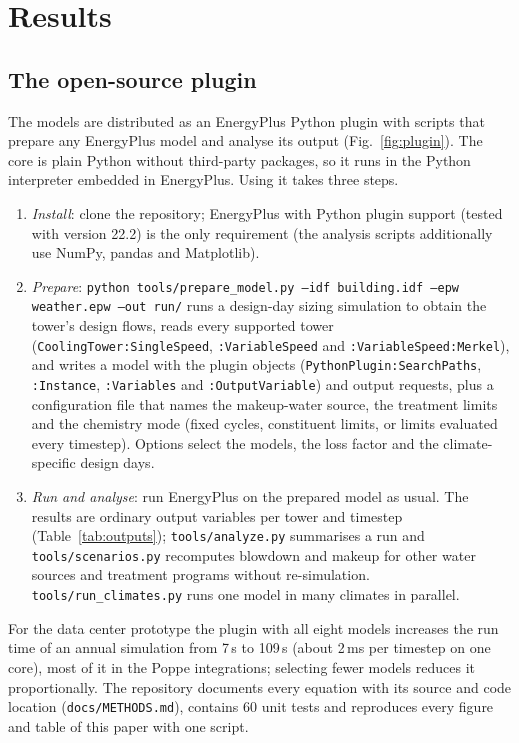 \documentclass[preprint,12pt]{elsarticle}
\begin{document}
\section{Results}\label{sec:results}
\subsection{The open-source plugin}\label{sec:tool}
The models are distributed as an EnergyPlus Python plugin with scripts that prepare any EnergyPlus model and analyse
its output (Fig.~\ref{fig:plugin}). The core is plain Python without third-party packages, so it runs in the Python
interpreter embedded in EnergyPlus. Using it takes three steps.
\begin{enumerate}
\item \emph{Install}: clone the repository; EnergyPlus with Python plugin support (tested with version 22.2) is the only
requirement (the analysis scripts additionally use NumPy, pandas and Matplotlib).
\item \emph{Prepare}: \texttt{python tools/prepare\_model.py --idf building.idf --epw weather.epw --out run/} runs a
design-day sizing simulation to obtain the tower's design flows, reads every supported tower
(\texttt{CoolingTower:SingleSpeed}, \texttt{:VariableSpeed} and \texttt{:VariableSpeed:Merkel}), and writes a model with
the plugin objects (\texttt{PythonPlugin:SearchPaths}, \texttt{:Instance}, \texttt{:Variables} and
\texttt{:OutputVariable}) and output requests, plus a configuration file that names the makeup-water source, the treatment
limits and the chemistry mode (fixed cycles, constituent limits, or limits evaluated every timestep). Options select the
models, the loss factor and the climate-specific design days.
\item \emph{Run and analyse}: run EnergyPlus on the prepared model as usual. The results are ordinary output variables
per tower and timestep (Table~\ref{tab:outputs}); \texttt{tools/analyze.py} summarises a run and
\texttt{tools/scenarios.py} recomputes blowdown and makeup for other water sources and treatment programs without
re-simulation. \texttt{tools/run\_climates.py} runs one model in many climates in parallel.
\end{enumerate}
For the data center prototype the plugin with all eight models increases the run time of an annual simulation from 7\,s
to 109\,s (about 2\,ms per timestep on one core), most of it in the Poppe integrations; selecting fewer models reduces it
proportionally. The repository documents every equation with its source and code location (\texttt{docs/METHODS.md}),
contains 60 unit tests and reproduces every figure and table of this paper with one script.
\end{document}
